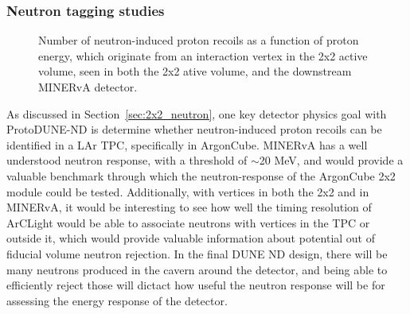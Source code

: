 \subsubsection{Neutron tagging studies}

\begin{figure}[htb]
  \centering
  \caption{Number of neutron-induced proton recoils as a function of proton energy, which originate from an interaction vertex in the 2x2 active volume, seen in both the 2x2 ative volume, and the downstream MINERvA detector.}
  \label{fig:neutron_tag_minerva}
\end{figure}
As discussed in Section~\ref{sec:2x2_neutron}, one key detector physics goal with ProtoDUNE-ND is determine whether neutron-induced proton recoils can be identified in a LAr TPC, specifically in ArgonCube. MINERvA has a well understood neutron response, with a threshold of $\sim$20 MeV, and would provide a valuable benchmark through which the neutron-response of the ArgonCube 2x2 module could be tested. Additionally, with vertices in both the 2x2 and in MINERvA, it would be interesting to see how well the timing resolution of ArCLight would be able to associate neutrons with vertices in the TPC or outside it, which would provide valuable information about potential out of fiducial volume neutron rejection. In the final DUNE ND design, there will be many neutrons produced in the cavern around the detector, and being able to efficiently reject those will dictact how useful the neutron response will be for assessing the energy response of the detector.


